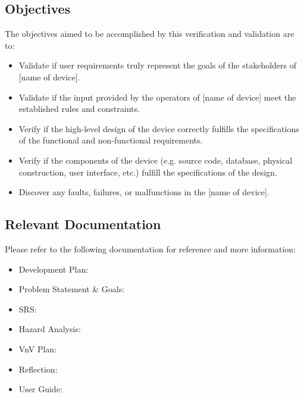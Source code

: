 \documentclass[12pt, titlepage]{article}
\begin{document}
\subsection{Objectives}

The objectives aimed to be accomplished by this verification and validation are to:

\begin{itemize}
\item Validate if user requirements truly represent the goals of the stakeholders of [name of device].
\item Validate if the input provided by the operators of [name of device] meet the established rules and constraints.
\item Verify if the high-level design of the device correctly fulfills the specifications of the functional and non-functional requirements.
\item Verify if the components of the device (e.g. source code, database, physical construction, user interface, etc.) fulfill the specifications of the design. 
\item Discover any faults, failures, or malfunctions in the [name of device].
\end{itemize}

\subsection{Relevant Documentation}

Please refer to the following documentation for reference and more information:
\begin{itemize}
\item Development Plan: \citet{Development_Plan}
\item Problem Statement \& Goals: \citet{Prob_n_Goals}
\item SRS: \citet{SRS}
\item Hazard Analysis: \citet{Hazard_Analysis}
\item VnV Plan: \citet{VnV_Plan}
\item Reflection: \citet{Reflection}
\item User Guide: \citet{User_Guide}
\end{itemize}
\end{document}
